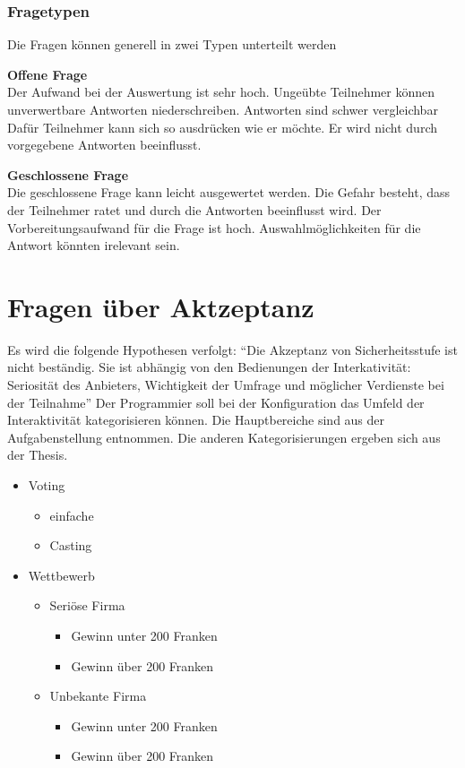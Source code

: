 \subsubsection{Fragetypen}\label{fragetypen}

Die Fragen können generell in zwei Typen unterteilt werden

\textbf{Offene Frage}\\
Der Aufwand bei der Auswertung ist sehr hoch. Ungeübte Teilnehmer können
unverwertbare Antworten niederschreiben. Antworten sind schwer
vergleichbar Dafür Teilnehmer kann sich so ausdrücken wie er möchte. Er
wird nicht durch vorgegebene Antworten beeinflusst.

\textbf{Geschlossene Frage}\\
Die geschlossene Frage kann leicht ausgewertet werden. Die Gefahr
besteht, dass der Teilnehmer ratet und durch die Antworten beeinflusst
wird. Der Vorbereitungsaufwand für die Frage ist hoch.
Auswahlmöglichkeiten für die Antwort könnten irelevant sein.

\newpage

\section{Fragen über Aktzeptanz}\label{fragen-uxfcber-aktzeptanz}

Es wird die folgende Hypothesen verfolgt: ``Die Akzeptanz von
Sicherheitsstufe ist nicht beständig. Sie ist abhängig von den
Bedienungen der Interkativität: Seriosität des Anbieters, Wichtigkeit
der Umfrage und möglicher Verdienste bei der Teilnahme'' Der Programmier
soll bei der Konfiguration das Umfeld der Interaktivität kategorisieren
können. Die Hauptbereiche sind aus der Aufgabenstellung entnommen. Die
anderen Kategorisierungen ergeben sich aus der Thesis.

\begin{itemize}
\item
  Voting

  \begin{itemize}
  \item
    einfache
  \item
    Casting
  \end{itemize}
\item
  Wettbewerb

  \begin{itemize}
  \item
    Seriöse Firma

    \begin{itemize}
    \item
      Gewinn unter 200 Franken
    \item
      Gewinn über 200 Franken
    \end{itemize}
  \item
    Unbekante Firma

    \begin{itemize}
    \item
      Gewinn unter 200 Franken
    \item
      Gewinn über 200 Franken
    \end{itemize}
  \end{itemize}
\end{itemize}

